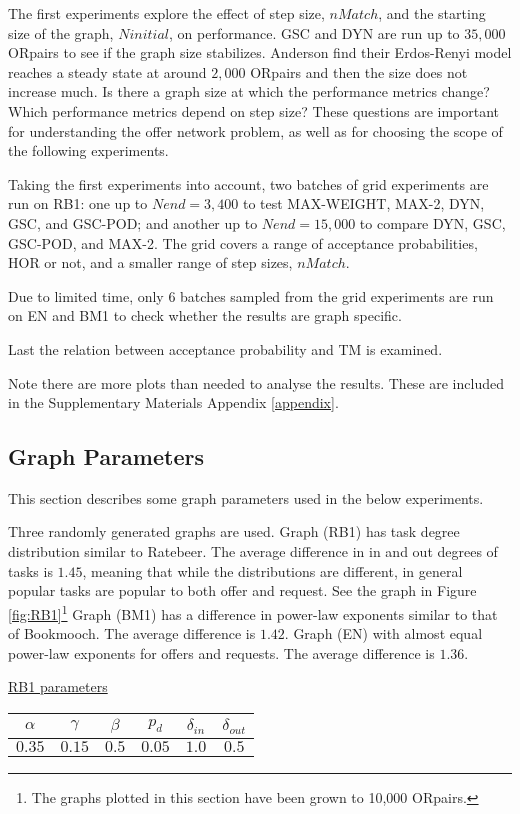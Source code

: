 \documentclass[main.tex]{subfiles}
\begin{document}
The first experiments explore the effect of step size, $nMatch$, and the starting size of the graph, $Ninitial$, on performance. GSC and DYN are run up to $35,000$ ORpairs to see if the graph size stabilizes. Anderson \cite{And1} find their Erdos-Renyi model reaches a steady state at around $2,000$ ORpairs and then the size does not increase much. Is there a graph size at which the performance metrics change? Which performance metrics depend on step size? These questions are important for understanding the offer network problem, as well as for choosing the scope of the following experiments.

Taking the first experiments into account, two batches of grid experiments are run on RB1: one up to $Nend = 3,400$ to test MAX-WEIGHT, MAX-2, DYN, GSC, and GSC-POD; and another up to $Nend = 15,000$ to compare DYN, GSC, GSC-POD, and MAX-2. The grid covers a range of acceptance probabilities, HOR or not, and a smaller range of step sizes, $nMatch$.

Due to limited time, only 6 batches sampled from the grid experiments are run on EN and BM1 to check whether the results are graph specific.

Last the relation between acceptance probability and TM is examined.

Note there are more plots than needed to analyse the results. These are included in the Supplementary Materials Appendix \ref{appendix}.

\subsection{Graph Parameters}
This section describes some graph parameters used in the below experiments.

Three randomly generated graphs are used. Graph (RB1) has task degree distribution similar to Ratebeer. The average difference in in and out degrees of tasks is $1.45$, meaning that while the distributions are different, in general popular tasks are popular to both offer and request. See the graph in Figure \ref{fig:RB1}\footnote{The graphs plotted in this section have been grown to 10,000 ORpairs.} Graph (BM1) has a difference in power-law exponents similar to that of Bookmooch. The average difference is $1.42$. Graph (EN) with almost equal power-law exponents for offers and requests. The average difference is $1.36$.


\begin{center}
  \underline{RB1 parameters}

  \begin{tabular}{| c | c | c | c | c | c | }
    \hline
    $\alpha$ & $\gamma$ & $\beta$ & $p_d$ & $\delta_{in}$ & $\delta_{out}$ \\ \hline
    $0.35$ & $0.15$ & $0.5$ & $0.05$ & $1.0$ & $0.5$ \\
    \hline
  \end{tabular}
\end{center}
\end{document}
